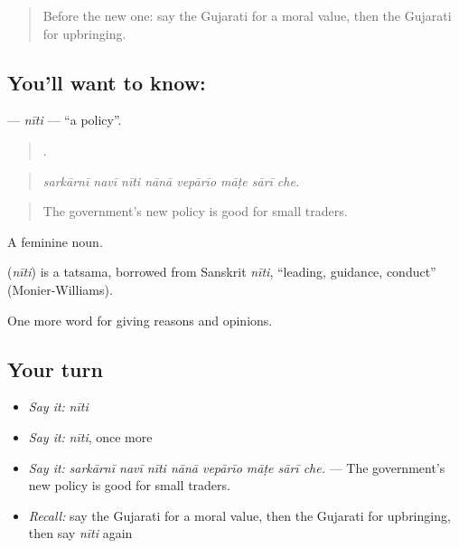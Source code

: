 \label{lesson:GU-C357-niti}



\begin{quote}
Before the new one: say the Gujarati for a moral value, then the Gujarati for upbringing.
\end{quote}

\subsection*{You'll want to know: }
\textbf{} — \emph{nīti} — \textquotedblleft{}a policy\textquotedblright{}.

\begin{quote}
       .
\end{quote}

\begin{quote}
\emph{sarkārnī navī nīti nānā vepārīo māṭe sārī che.}
\end{quote}

\begin{quote}
The government's new policy is good for small traders.
\end{quote}

A feminine noun.

\begin{cousinweb}
\textbf{} (\emph{nīti}) is a tatsama, borrowed from Sanskrit \emph{nīti}, \textquotedblleft{}leading, guidance, conduct\textquotedblright{} (Monier-Williams).
\end{cousinweb}

\begin{grammarlens}[title={What you've built}]
One more word for giving reasons and opinions.
\end{grammarlens}

\subsection*{Your turn}
\begin{itemize}
\raggedright
  \item \emph{Say it:} \emph{nīti}
  \item \emph{Say it:} \emph{nīti}, once more
  \item \emph{Say it:} \emph{sarkārnī navī nīti nānā vepārīo māṭe sārī che.} — The government's new policy is good for small traders.
  \item \emph{Recall:} say the Gujarati for a moral value, then the Gujarati for upbringing, then say \emph{nīti} again
\end{itemize}


